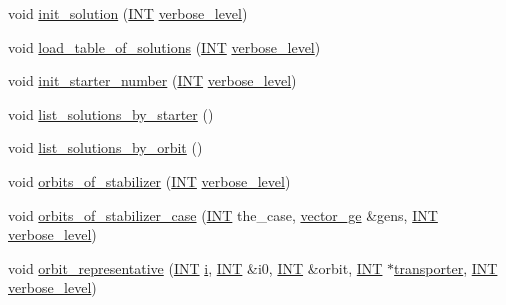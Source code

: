 \begin{DoxyCompactItemize}
\item 
void \mbox{\hyperlink{classisomorph_ac3c171a595b93a33ac8a9e5d2d7b6eab}{init\+\_\+solution}} (\mbox{\hyperlink{galois_8h_a09fddde158a3a20bd2dcadb609de11dc}{I\+NT}} \mbox{\hyperlink{simeon_8_c_a818073fbcc2f439e7c56952f67386122}{verbose\+\_\+level}})
\item 
void \mbox{\hyperlink{classisomorph_a21ab5aba74a200b9abf041dc5206821a}{load\+\_\+table\+\_\+of\+\_\+solutions}} (\mbox{\hyperlink{galois_8h_a09fddde158a3a20bd2dcadb609de11dc}{I\+NT}} \mbox{\hyperlink{simeon_8_c_a818073fbcc2f439e7c56952f67386122}{verbose\+\_\+level}})
\item 
void \mbox{\hyperlink{classisomorph_a93b1d8fa988ca12f5f231fc4420873b2}{init\+\_\+starter\+\_\+number}} (\mbox{\hyperlink{galois_8h_a09fddde158a3a20bd2dcadb609de11dc}{I\+NT}} \mbox{\hyperlink{simeon_8_c_a818073fbcc2f439e7c56952f67386122}{verbose\+\_\+level}})
\item 
void \mbox{\hyperlink{classisomorph_a9c40f343f1a3e5fc177e5121bc809b06}{list\+\_\+solutions\+\_\+by\+\_\+starter}} ()
\item 
void \mbox{\hyperlink{classisomorph_adefb1a89c097c284d29f92d5fc58ebfa}{list\+\_\+solutions\+\_\+by\+\_\+orbit}} ()
\item 
void \mbox{\hyperlink{classisomorph_a72bbdc12cca5a90045ef15d0b24075e6}{orbits\+\_\+of\+\_\+stabilizer}} (\mbox{\hyperlink{galois_8h_a09fddde158a3a20bd2dcadb609de11dc}{I\+NT}} \mbox{\hyperlink{simeon_8_c_a818073fbcc2f439e7c56952f67386122}{verbose\+\_\+level}})
\item 
void \mbox{\hyperlink{classisomorph_a3b94e31db6bd2516bccb74b772678835}{orbits\+\_\+of\+\_\+stabilizer\+\_\+case}} (\mbox{\hyperlink{galois_8h_a09fddde158a3a20bd2dcadb609de11dc}{I\+NT}} the\+\_\+case, \mbox{\hyperlink{classvector__ge}{vector\+\_\+ge}} \&gens, \mbox{\hyperlink{galois_8h_a09fddde158a3a20bd2dcadb609de11dc}{I\+NT}} \mbox{\hyperlink{simeon_8_c_a818073fbcc2f439e7c56952f67386122}{verbose\+\_\+level}})
\item 
void \mbox{\hyperlink{classisomorph_acdfd35e2cb33942945e10dedeb4a210f}{orbit\+\_\+representative}} (\mbox{\hyperlink{galois_8h_a09fddde158a3a20bd2dcadb609de11dc}{I\+NT}} \mbox{\hyperlink{alphabet2_8_c_acb559820d9ca11295b4500f179ef6392}{i}}, \mbox{\hyperlink{galois_8h_a09fddde158a3a20bd2dcadb609de11dc}{I\+NT}} \&i0, \mbox{\hyperlink{galois_8h_a09fddde158a3a20bd2dcadb609de11dc}{I\+NT}} \&orbit, \mbox{\hyperlink{galois_8h_a09fddde158a3a20bd2dcadb609de11dc}{I\+NT}} $\ast$\mbox{\hyperlink{classisomorph_ad835b4f9fdd2cc4f486ff10972f43758}{transporter}}, \mbox{\hyperlink{galois_8h_a09fddde158a3a20bd2dcadb609de11dc}{I\+NT}} \mbox{\hyperlink{simeon_8_c_a818073fbcc2f439e7c56952f67386122}{verbose\+\_\+level}})

\end{DoxyCompactItemize}
